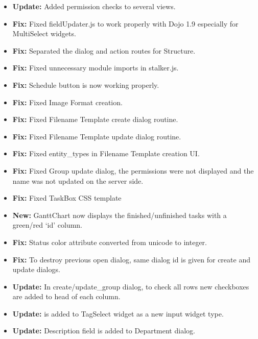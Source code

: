 \documentclass[a4paper,10pt,english]{sphinxmanual}
\begin{document}
\begin{itemize}
\begin{itemize}
\item {} 
\textbf{Update:} Added permission checks to several views.

\item {} 
\textbf{Fix:} Fixed fieldUpdater.js to work properly with Dojo 1.9 especially for
MultiSelect widgets.

\item {} 
\textbf{Fix:} Separated the dialog and action routes for Structure.

\item {} 
\textbf{Fix:} Fixed unnecessary module imports in stalker.js.

\item {} 
\textbf{Fix:} Schedule button is now working properly.

\item {} 
\textbf{Fix:} Fixed Image Format creation.

\item {} 
\textbf{Fix:} Fixed Filename Template create dialog routine.

\item {} 
\textbf{Fix:} Fixed Filename Template update dialog routine.

\item {} 
\textbf{Fix:} Fixed entity\_types in Filename Template creation UI.

\item {} 
\textbf{Fix:} Fixed Group update dialog, the permissions were not displayed and the
name was not updated on the server side.

\item {} 
\textbf{Fix:} Fixed TaskBox CSS template

\item {} 
\textbf{New:} GanttChart now displays the finished/unfinished tasks with a green/red
`id' column.

\item {} 
\textbf{Fix:} Status color attribute converted from unicode to integer.

\item {} 
\textbf{Fix:} To destroy previous open dialog, same dialog id is given for create
and update dialogs.

\item {} 
\textbf{Update:} In create/update\_group dialog, to check all rows new checkboxes are
added to head of each column.

\item {} 
\textbf{Update:}  is added to TagSelect widget as a new input widget
type.

\item {} 
\textbf{Update:} Description field is added to Department dialog.

\end{itemize}

\end{itemize}
\end{document}
